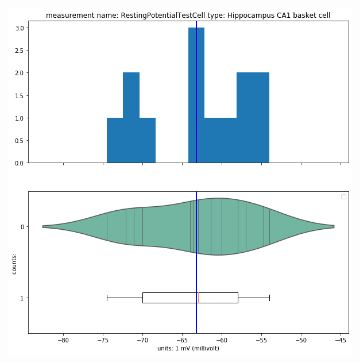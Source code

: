 \begin{figure}
\begin{center}
\begin{subfigure}{scale=0.5}
  \label{fig:sub1}
\end{subfigure}%
\begin{subfigure}{scale=0.5}
  \centering
  \includegraphics[scale=0.45]{notebooks_converted/needata_thesis_files/needata_thesis_5_6}
    
  \label{fig:sub2}
\end{subfigure}


\end{center}
\end{figure}
